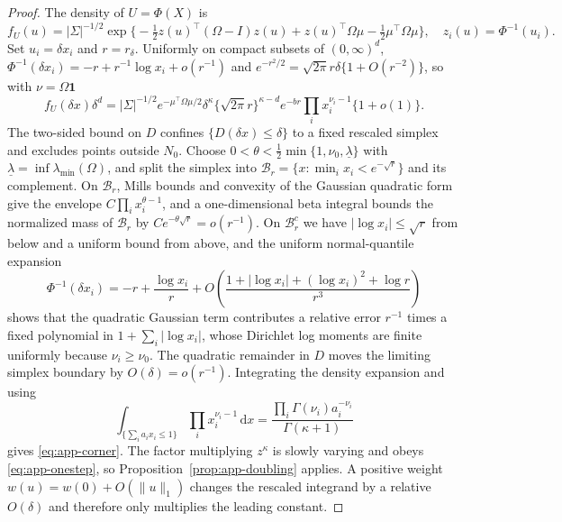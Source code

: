 \documentclass[bj,authoryear]{imsart}
\theoremstyle{plain}
\begin{document}
\begin{appendix}
\begin{proof}
The density of $U=\Phi(X)$ is
\[
 f_U(u)=|\Sigma|^{-1/2}
 \exp\bigl\{-\tfrac12z(u)^\top(\Omega-I)z(u)+z(u)^\top\Omega\mu
 -\tfrac12\mu^\top\Omega\mu\bigr\},
 \quad z_i(u)=\Phi^{-1}(u_i).
\]
Set $u_i=\delta x_i$ and $r=r_\delta$. Uniformly on compact subsets of
$(0,\infty)^d$,
$\Phi^{-1}(\delta x_i)=-r+r^{-1}\log x_i+o(r^{-1})$ and
$e^{-r^2/2}=\sqrt{2\pi}r\delta\{1+O(r^{-2})\}$, so with $\nu=\Omega\mathbf 1$
\[
 f_U(\delta x)\delta^d=|\Sigma|^{-1/2}e^{-\mu^\top\Omega\mu/2}
 \delta^{\kappa}\{\sqrt{2\pi}r\}^{\kappa-d}e^{-br}
 \prod_ix_i^{\nu_i-1}\{1+o(1)\}.
\]
The two-sided bound on $D$ confines $\{D(\delta x)\le\delta\}$ to a
fixed rescaled simplex and excludes points outside $N_0$. Choose
$0<\theta<\tfrac12\min\{1,\nu_0,\underline\lambda\}$ with
$\underline\lambda=\inf\lambda_{\min}(\Omega)$, and split the simplex into
$\mathcal B_r=\{x:\min_ix_i<e^{-\sqrt r}\}$ and its complement. On
$\mathcal B_r$, Mills bounds and convexity of the Gaussian quadratic form
give the envelope $C\prod_ix_i^{\theta-1}$, and a one-dimensional beta
integral bounds the normalized mass of $\mathcal B_r$ by
$Ce^{-\theta\sqrt r}=o(r^{-1})$. On $\mathcal B_r^c$ we have
$|\log x_i|\le\sqrt r$ from below and a uniform bound from above, and the
uniform normal-quantile expansion
\[
 \Phi^{-1}(\delta x_i)=-r+\frac{\log x_i}{r}
 +O\!\left(\frac{1+|\log x_i|+(\log x_i)^2+\log r}{r^3}\right)
\]
shows that the quadratic Gaussian term contributes a relative error
$r^{-1}$ times a fixed polynomial in $1+\sum_i|\log x_i|$, whose
Dirichlet log moments are finite uniformly because $\nu_i\ge\nu_0$. The
quadratic remainder in $D$ moves the limiting simplex boundary by
$O(\delta)=o(r^{-1})$. Integrating the density expansion and using
\[
 \int_{\{\sum_ia_ix_i\le1\}}\prod_ix_i^{\nu_i-1}\,\mathrm dx
 =\frac{\prod_i\Gamma(\nu_i)a_i^{-\nu_i}}{\Gamma(\kappa+1)}
\]
gives \eqref{eq:app-corner}. The factor multiplying $z^\kappa$ is
slowly varying and obeys \eqref{eq:app-onestep}, so
Proposition~\ref{prop:app-doubling} applies. A positive weight
$w(u)=w(0)+O(\|u\|_1)$ changes the rescaled integrand by a relative
$O(\delta)$ and therefore only multiplies the leading constant.
\end{proof}


\end{appendix}
\end{document}
